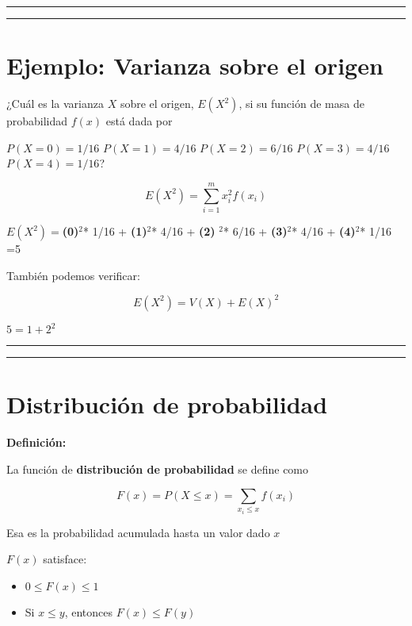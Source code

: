 \documentclass[
]{book}
\providecommand{\tightlist}{%
  \setlength{\itemsep}{0pt}\setlength{\parskip}{0pt}}
\begin{document}
\begin{center}\rule{0.5\linewidth}{0.5pt}\end{center}

\begin{center}\rule{0.5\linewidth}{0.5pt}\end{center}

\hypertarget{ejemplo-varianza-sobre-el-origen}{%
\section{Ejemplo: Varianza sobre el origen}\label{ejemplo-varianza-sobre-el-origen}}

¿Cuál es la varianza \(X\) sobre el origen, \(E(X^2)\), si su función de masa de probabilidad \(f(x)\) está dada por

\(P(X=0)=1/16\)
\(P(X=1)=4/16\)
\(P(X=2)=6/16\)
\(P(X=3)=4/16\)
\(P(X=4)=1/16\)?

\[E(X^2) =\sum_{i=1}^m x_i^2 f(x_i)\]

\(E(X^2)=\)\textbf{(0)}\(^2\)* 1/16 + \textbf{(1)}\(^2\)* 4/16 + \textbf{(2)} \(^2\)* 6/16 + \textbf{(3)}\(^2\)* 4/16 + \textbf{(4)}\(^2\)* 1/16 =5

También podemos verificar:

\[E(X^2)=V(X)+E(X)^2\]

\(5=1+2^2\)

\begin{center}\rule{0.5\linewidth}{0.5pt}\end{center}

\begin{center}\rule{0.5\linewidth}{0.5pt}\end{center}

\hypertarget{distribuciuxf3n-de-probabilidad}{%
\section{Distribución de probabilidad}\label{distribuciuxf3n-de-probabilidad}}

\textbf{Definición:}

La función de \textbf{distribución de probabilidad} se define como

\[F(x)=P(X\leq x)=\sum_{x_i\leq x} f(x_i) \]

Esa es la probabilidad acumulada hasta un valor dado \(x\)

\(F(x)\) satisface:

\begin{itemize}
\tightlist
\item
  \(0\leq F(x) \leq 1\)
\item
  Si \(x \leq y\), entonces \(F(x) \leq F(y)\)
\end{itemize}
\end{document}
